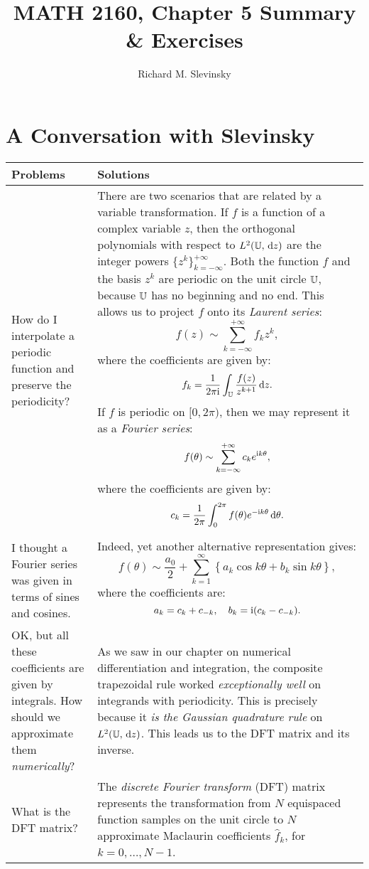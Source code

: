 \documentclass[11pt,letterpaper]{article}
\begin{document}
\title{MATH 2160, Chapter 5 Summary \& Exercises}
\author{Richard M. Slevinsky}
\date{}
\maketitle

\section*{A Conversation with Slevinsky}

\begin{longtable}{p{}|p{}}
\hline
Problems & Solutions\\
\hline
How do I interpolate a periodic function and preserve the periodicity? & There are two scenarios that are related by a variable transformation. If $f$ is a function of a complex variable $z$, then the orthogonal polynomials with respect to $L^2(\mathbb{U},{\rm\,d} z)$ are the integer powers $\{z^k\}_{k=-\infty}^{+\infty}$. Both the function $f$ and the basis $z^k$ are periodic on the unit circle $\mathbb{U}$, because $\mathbb{U}$ has no beginning and no end. This allows us to project $f$ onto its {\em Laurent series}:
\[
f(z) \sim \sum_{k=-\infty}^{+\infty} f_k z^k,
\]
where the coefficients are given by:
\[
f_k = \dfrac{1}{2\pi{\rm i}}\int_{\mathbb{U}} \dfrac{f(z)}{z^{k+1}}{\rm\,d} z.
\]
If $f$ is periodic on $[0,2\pi)$, then we may represent it as a {\em Fourier series}:
\[
f(\theta) \sim \sum_{k=-\infty}^{+\infty} c_k e^{{\rm i} k\theta},
\]
where the coefficients are given by:
\[
c_k = \dfrac{1}{2\pi}\int_0^{2\pi} f(\theta) e^{-{\rm i} k\theta}{\rm\,d}\theta.
\]\\
I thought a Fourier series was given in terms of sines and cosines. & Indeed, yet another alternative representation gives:
\[
f(\theta) \sim \dfrac{a_0}{2} + \sum_{k=1}^\infty \left\{ a_k\cos k\theta + b_k\sin k\theta\right\},
\]
where the coefficients are:
\[
a_k = c_k+c_{-k},\quad b_k = {\rm i}(c_k-c_{-k}).
\]
\\
\hline
OK, but all these coefficients are given by integrals. How should we approximate them {\em numerically}? & As we saw in our chapter on numerical differentiation and integration, the composite trapezoidal rule worked {\em exceptionally well} on integrands with periodicity. This is precisely because it {\em is the Gaussian quadrature rule} on $L^2(\mathbb{U},{\rm\,d} z)$. This leads us to the DFT matrix and its inverse.\\
\hline
What is the DFT matrix? & The {\em discrete Fourier transform} (DFT) matrix represents the transformation from $N$ equispaced function samples on the unit circle to $N$ approximate Maclaurin coefficients $\hat{f}_k$, for $k=0,\ldots,N-1$.\\

\end{longtable}
\end{document}
